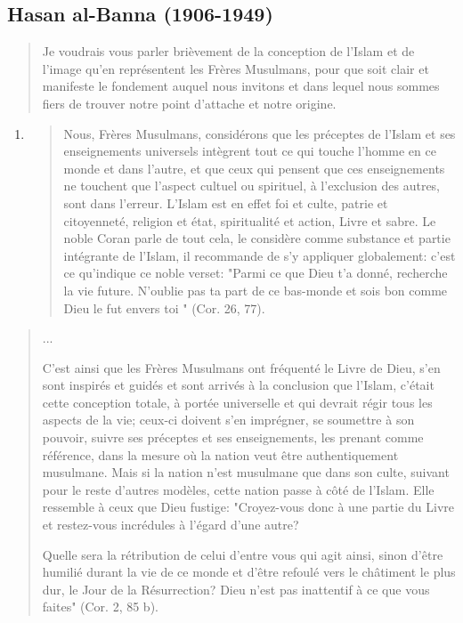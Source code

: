 \hypertarget{hasan-al-banna-1906-1949}{%
\subsection{\texorpdfstring{{Hasan al-Banna
(1906-1949)}}{Hasan al-Banna (1906-1949)}}\label{hasan-al-banna-1906-1949}}

\begin{quote}
Je voudrais vous parler brièvement de la conception de l'Islam et de
l'image qu'en représentent les Frères Musulmans, pour que soit clair et
manifeste le fondement auquel nous invitons et dans lequel nous sommes
fiers de trouver notre point d'attache et notre origine.
\end{quote}

\begin{enumerate}
\def\labelenumi{\arabic{enumi}.}
\item
  \begin{quote}
  Nous, Frères Musulmans, considérons que les préceptes de l'Islam et
  ses enseignements universels intègrent tout ce qui touche l'homme en
  ce monde et dans l'autre, et que ceux qui pensent que ces
  enseignements ne touchent que l'aspect cultuel ou spirituel, à
  l'exclusion des autres, sont dans l'erreur. L'Islam est en effet foi
  et culte, patrie et citoyenneté, religion et état, spiritualité et
  action, Livre et sabre. Le noble Coran parle de tout cela, le
  considère comme substance et partie intégrante de l'Islam, il
  recommande de s'y appliquer globalement: c'est ce qu'indique ce noble
  verset: "Parmi ce que Dieu t'a donné, recherche la vie future.
  N'oublie pas ta part de ce bas-monde et sois bon comme Dieu le fut
  envers toi " (Cor. 26, 77).
  \end{quote}
\end{enumerate}

\begin{quote}
...

C'est ainsi que les Frères Musulmans ont fréquenté le Livre de Dieu,
s'en sont inspirés et guidés et sont arrivés à la conclusion que
l'Islam, c'était cette conception totale, à portée universelle et qui
devrait régir tous les aspects de la vie; ceux-ci doivent s'en
imprégner, se soumettre à son pouvoir, suivre ses préceptes et ses
enseignements, les prenant comme référence, dans la mesure où la nation
veut être authentiquement musulmane. Mais si la nation n'est musulmane
que dans son culte, suivant pour le reste d'autres modèles, cette nation
passe à côté de l'Islam. Elle ressemble à ceux que Dieu fustige:
"Croyez-vous donc à une partie du Livre et restez-vous incrédules à
l'égard d'une autre?

Quelle sera la rétribution de celui d'entre vous qui agit ainsi, sinon
d'être humilié durant la vie de ce monde et d'être refoulé vers le
châtiment le plus dur, le Jour de la Résurrection? Dieu n'est pas
inattentif à ce que vous faites" (Cor. 2, 85 b).
\end{quote}

